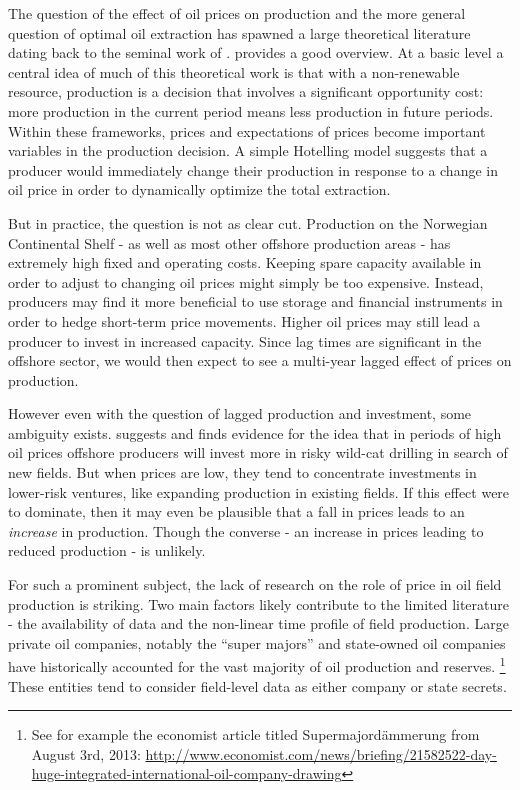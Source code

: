 \documentclass[12pt]{article}
\begin{document}
The question of the effect of oil prices on production and the more general question of optimal oil extraction has spawned a large theoretical literature dating back to the seminal work of \citet{hotelling_economics_1931}. \citet{krautkraemer_nonrenewable_1998} provides a good overview. At a basic level a central idea of much of this theoretical work is that with a non-renewable resource, production is a decision that involves a significant opportunity cost: more production in the current period means less production in future periods.  Within these frameworks, prices and expectations of prices become important variables in the production decision. A simple Hotelling model suggests that a producer would immediately change their production in response to a change in oil price in order to dynamically optimize the total extraction.

But in practice, the question is not as clear cut.  Production on the Norwegian Continental Shelf - as well as most other offshore production areas - has extremely high fixed and operating costs.  Keeping spare capacity available in order to adjust to changing oil prices might simply be too expensive.  Instead, producers may find it more beneficial to use storage and financial instruments in order to hedge short-term price movements. Higher oil prices may still lead a producer to invest in increased capacity.  Since lag times are significant in the offshore sector, we would then expect to see a multi-year lagged effect of prices on production.  

However even with the question of lagged production and investment, some ambiguity exists.  \citet{mohn_efforts_2008} suggests and finds evidence for the idea that in periods of high oil prices offshore producers will invest more in risky wild-cat drilling in search of new fields. But when prices are low, they tend to concentrate investments in lower-risk ventures, like expanding production in existing fields. If this effect were to dominate, then it may even be plausible that a fall in prices leads to an \emph{increase} in production. Though the converse - an increase in prices leading to reduced production - is unlikely.  


For such a prominent subject, the lack of research on the role of price in oil field production is striking. Two main factors likely contribute to the limited literature - the availability of data and the non-linear time profile of field production.  Large private oil companies, notably the “super majors” and state-owned oil companies have historically accounted for the vast majority of oil production and reserves. \footnote{See for example the economist article titled Supermajordämmerung from August 3rd, 2013: \url{http://www.economist.com/news/briefing/21582522-day-huge-integrated-international-oil-company-drawing}} These entities tend to consider field-level data as either company or state secrets.   
\end{document}

